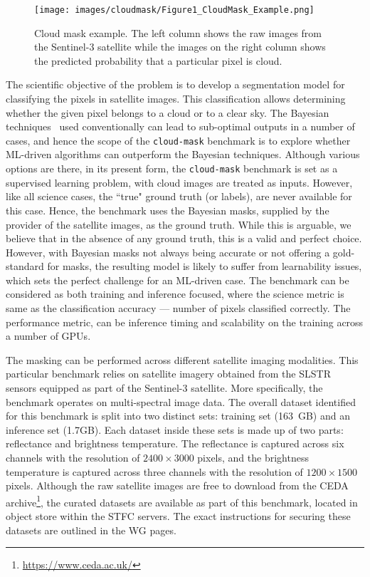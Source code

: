 
\begin{figure}[!htb]
    \centering
    \texttt{[image: images/cloudmask/Figure1\_CloudMask\_Example.png]}
    \caption{Cloud mask example. The left column shows the raw images from the Sentinel-3 satellite while the images on the right column shows the predicted probability that a particular pixel is cloud. }
    \label{fig:cm-example}
\end{figure}


 The scientific objective of the problem is to develop a segmentation model for  classifying the pixels in satellite images. This classification allows determining whether the given pixel belongs to a cloud or to a clear sky. The Bayesian techniques~\cite{merchant:2005} used conventionally can lead to sub-optimal outputs in a number of cases, and hence the scope of the  {\tt cloud-mask} benchmark is to explore whether ML-driven algorithms can outperform the Bayesian techniques. Although various options are there, in its present form, the {\tt cloud-mask} benchmark is set as a supervised learning problem, with cloud images are treated as inputs. However,  like all science cases, the  “true" ground truth (or labels), are never available for this case. Hence, the benchmark uses the Bayesian masks, supplied by the provider of the satellite images, as the ground truth. While this is arguable, we believe that in the absence of any ground truth, this is a valid and perfect choice. However, with Bayesian masks  not always being accurate or not offering a gold-standard for masks,  the resulting model is likely to suffer from learnability issues, which sets the perfect challenge for an ML-driven case. The benchmark can be considered as  both training and inference focused, where the science metric is same as the classification accuracy --- number of pixels classified correctly. The performance metric, can be inference timing and scalability on the training across a number of GPUs. 

\smallskip

 The masking can be performed across different satellite imaging modalities. This particular benchmark relies on satellite imagery obtained from the SLSTR sensors equipped as part of the Sentinel-3 satellite. More specifically, the benchmark operates on multi-spectral image data. The overall dataset identified for this benchmark is split into two distinct sets: training set (163~GB) and an inference set (1.7GB). Each dataset inside these sets is made up of two parts: reflectance and brightness temperature. The reflectance is  captured across six channels with the resolution of $2400\times3000$ pixels, and the brightness temperature is captured across three channels with the resolution of $1200\times1500$ pixels. Although the raw satellite images are free to download from the CEDA archive\footnote{\url{https://www.ceda.ac.uk/}}, the curated datasets are available as part of this benchmark, located in object store within the STFC servers. The exact instructions for securing these datasets are outlined in the WG pages. 

